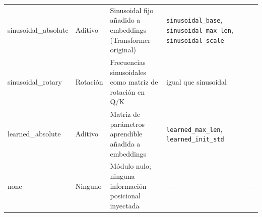 \begin{longtable}{L{2.4cm}L{1.7cm}L{4.2cm}L{2.0cm}L{2.0cm}}
sinusoidal\_absolute & Aditivo & Sinusoidal fijo añadido a embeddings (Transformer original) & \texttt{sinusoidal\_base}, \texttt{sinusoidal\_max\_len}, \texttt{sinusoidal\_scale} & \citep{vaswani_attention_2017} \\
sinusoidal\_rotary & Rotación & Frecuencias sinusoidales como matriz de rotación en Q/K & igual que sinusoidal & \citep{vaswani_attention_2017} \\
learned\_absolute & Aditivo & Matriz de parámetros aprendible añadida a embeddings & \texttt{learned\_max\_len}, \texttt{learned\_init\_std} & \citep{vaswani_attention_2017} \\
none & Ninguno & Módulo nulo; ninguna información posicional inyectada & --- & --- \\
\bottomrule
\end{longtable}
\normalsize